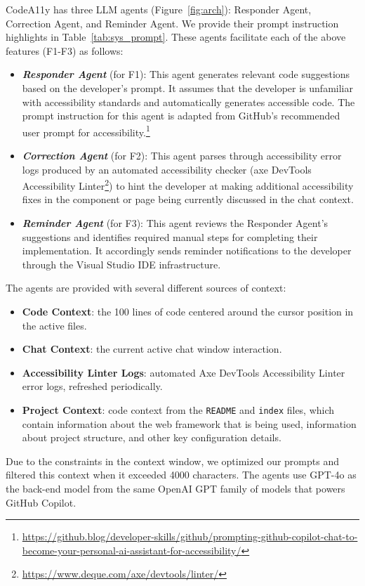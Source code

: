 CodeA11y has three LLM agents (Figure~\ref{fig:arch}): Responder Agent, Correction Agent, and Reminder Agent. We provide their prompt instruction highlights in Table~\ref{tab:sys_prompt}. These agents facilitate each of the above features (F1-F3) as follows:
\begin{itemize}
    \item \textbf{\textit{Responder Agent}} (for F1): This agent generates relevant code suggestions based on the developer's prompt. It assumes that the developer is unfamiliar with accessibility standards and automatically generates accessible code.
    The prompt instruction for this agent is adapted from GitHub's recommended user prompt for accessibility.\footnote{\url{https://github.blog/developer-skills/github/prompting-github-copilot-chat-to-become-your-personal-ai-assistant-for-accessibility/}}
    \item \textbf{\textit{Correction Agent}} (for F2): This agent parses through accessibility error logs produced by an automated accessibility checker (axe DevTools Accessibility Linter\footnote{\url{https://www.deque.com/axe/devtools/linter/}}) to
    hint the developer at making additional accessibility fixes in the component or page being currently discussed in the chat context.
    \item \textbf{\textit{Reminder Agent}} (for F3): This agent reviews the Responder Agent's suggestions and identifies required manual steps for completing their implementation. It accordingly sends reminder notifications to the developer through the Visual Studio IDE infrastructure.
\end{itemize}
\begin{highlight}
The agents are provided with several different sources of context:
\begin{itemize}
\item \textbf{Code Context}: the 100 lines of code centered around the cursor position in the active files.
\item \textbf{Chat Context}: the current active chat window interaction.
\item \textbf{Accessibility Linter Logs}: automated Axe DevTools Accessibility Linter error logs, refreshed periodically.
\item \textbf{Project Context}: code context from the \colorbox{codebgd}{\texttt{README}} and \colorbox{codebgd}{\texttt{index}} files, which contain information about the web framework that is being used, information about project structure, and other key configuration details.
\end{itemize}

Due to the constraints in the context window, we optimized our prompts and filtered this context when it exceeded 4000 characters. The agents use GPT-4o as the back-end model from the same OpenAI GPT family of models that powers GitHub Copilot.
\end{highlight}

